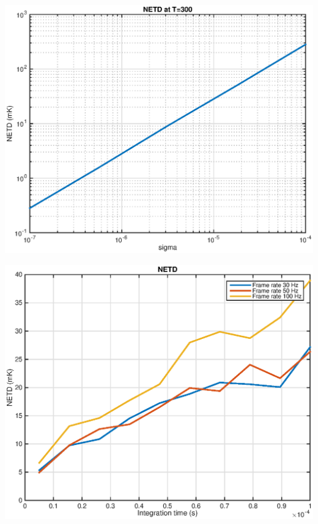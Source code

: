 \begin{center}
\includegraphics[scale=0.35]{gfx/NETD_as_function_of_sigma.eps} 	 
\end{center}

\begin{center}
\includegraphics[scale=0.35]{gfx/NETS_Function_of_Integration_Time.eps} 	 
\end{center}

